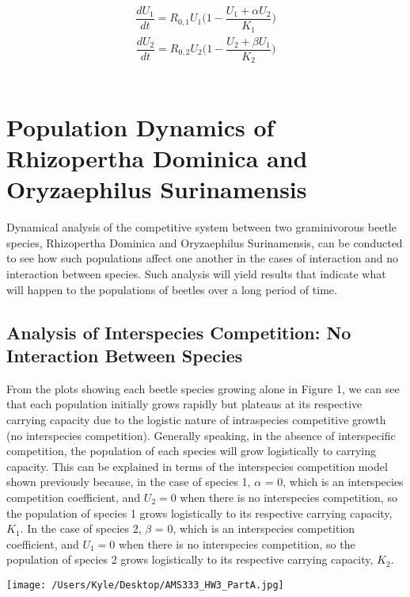 \documentclass[12pt]{article}
\begin{document}
\begin{gather*}
\dfrac{dU_1}{dt} = R_{0,1}U_1\Big(1 - \dfrac{U_1+{\alpha}U_2}{K_1}\Big) 
\end{gather*}
\begin{gather*}
\dfrac{dU_2}{dt} = R_{0,2}U_2\Big(1 - \dfrac{U_2+{\beta}U_1}{K_2}\Big) 
\end{gather*}\


\section{Population Dynamics of Rhizopertha Dominica and Oryzaephilus Surinamensis}
Dynamical analysis of the competitive system between two graminivorous beetle species, Rhizopertha Dominica and Oryzaephilus Surinamensis, can be conducted to see how such populations affect one another in the cases of interaction and no interaction between species. Such analysis will yield results that indicate what will happen to the populations of beetles over a long period of time.

\subsection*{Analysis of Interspecies Competition: No Interaction Between Species}

From the plots showing each beetle species growing alone in Figure 1, we can see that each population initially grows rapidly but plateaus at its respective carrying capacity due to the logistic nature of intraspecies competitive growth (no interspecies competition). Generally speaking, in the absence of interspecific competition, the population of each species will grow logistically to carrying capacity. This can be explained in terms of the interspecies competition model shown previously because, in the case of species 1, ${\alpha}$ = 0, which is an interspecies competition coefficient, and $U_2 = 0$ when there is no interspecies competition, so the population of species 1 grows logistically to its respective carrying capacity, $K_1$. In the case of species 2, ${\beta}$ = 0, which is an interspecies competition coefficient, and $U_1 = 0$ when there is no interspecies competition, so the population of species 2 grows logistically to its respective carrying capacity, $K_2$.  

\begin{center}
   \texttt{[image: /Users/Kyle/Desktop/AMS333\_HW3\_PartA.jpg]}
\end{center}
\end{document}
